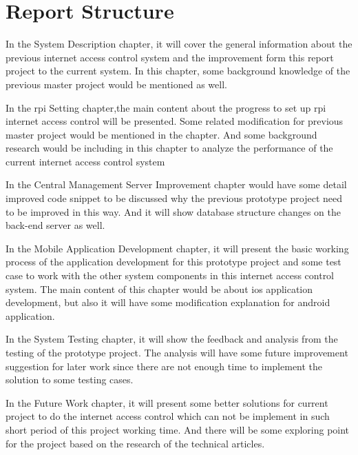 \section{Report Structure}
\par In the System Description chapter, it will cover the general information about the previous internet access control system and the improvement form this report project to the current system. In this chapter, some background knowledge of the previous master project\cite{TorgeirMR} would be mentioned as well.
\par In the \gls{rpi} Setting chapter,the main content about the progress to set up \gls{rpi} internet access control will be presented. Some related modification for previous master project would be mentioned in the chapter. And some background research would be including in this chapter to analyze the performance of the current internet access control system
\par In the Central Management Server Improvement chapter would have some detail improved code snippet to be discussed why the previous prototype project need to be improved in this way. And it will show database structure changes on the back-end server as well.
\par In the Mobile Application Development chapter, it will present the basic working process of the application development for this prototype project and some test case to work with the other system components in this internet access control system. The main content of this chapter would be about \gls{ios} application development, but also it will have some modification explanation for android application.
\par In the System Testing chapter, it will show the feedback and analysis from the testing of the prototype project. The analysis will have some future improvement suggestion for later work since there are not enough time to implement the solution to some testing cases.
\par In the Future Work chapter, it will present some better solutions for current project to do the internet access control which can not be implement in such short period of this project working time. And there will be some exploring point for the project based on the research of the technical articles.